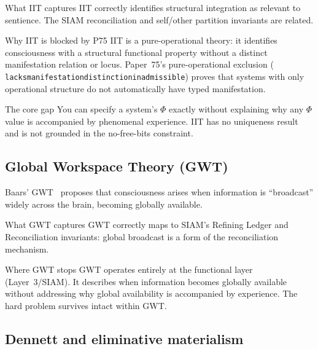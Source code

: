 \documentclass[11pt]{article}
\theoremstyle{remark}
\newcommand{\lean}[1]{%
  \penalty-100
  \begingroup\def\_{\textunderscore\allowbreak}\texttt{#1}\endgroup}
\begin{document}
\medskip
\begin{termlist}
  \item[What IIT captures]
    IIT correctly identifies structural integration as relevant to sentience. The
    SIAM reconciliation and self/other partition invariants are related.

  \item[Why IIT is blocked by P75]
    IIT is a pure-operational theory: it identifies consciousness with a structural
    functional property without a distinct manifestation relation or locus.
    Paper~75's pure-operational exclusion (\lean{lacks\_manifestation\allowbreak\_distinction\_inadmissible}) proves that systems with only operational
    structure do not automatically have typed manifestation.

  \item[The core gap]
    You can specify a system's $\Phi$ exactly without explaining why any $\Phi$ value
    is accompanied by phenomenal experience. IIT has no uniqueness result and is not
    grounded in the no-free-bits constraint.
\end{termlist}

\subsection{Global Workspace Theory (GWT)}

Baars' GWT~\cite{Baars1988} proposes that consciousness arises when information is
``broadcast'' widely across the brain, becoming globally available.

\medskip
\begin{termlist}
  \item[What GWT captures]
    GWT correctly maps to SIAM's Refining Ledger and Reconciliation invariants:
    global broadcast is a form of the reconciliation mechanism.

  \item[Where GWT stops]
    GWT operates entirely at the functional layer (Layer~3/SIAM). It describes
    when information becomes globally available without addressing why global
    availability is accompanied by experience. The hard problem survives intact
    within GWT.
\end{termlist}

\subsection{Dennett and eliminative materialism}
\end{document}
